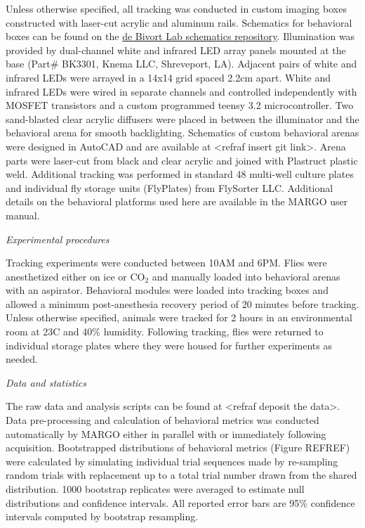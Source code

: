 \documentclass[10pt]{article}
\begin{document}
\begin{multicols}{2}
Unless otherwise specified, all tracking was conducted in custom imaging boxes constructed with laser-cut acrylic and aluminum rails. Schematics for behavioral boxes can be found on the \href{https://github.com/de-Bivort-Lab/dblab-schematics}{de Bivort Lab schematics repository}. Illumination was provided by dual-channel white and infrared LED array panels mounted at the base (Part# BK3301, Knema LLC, Shreveport, LA). Adjacent pairs of white and infrared LEDs were arrayed in a 14x14 grid spaced 2.2cm apart. White and infrared LEDs were wired in separate channels and controlled independently with MOSFET transistors and a custom programmed teensy 3.2 microcontroller. Two sand-blasted clear acrylic diffusers were placed in between the illuminator and the behavioral arena for smooth backlighting. Schematics of custom behavioral arenas were designed in AutoCAD and are available at <refraf insert git link>. Arena parts were laser-cut from black and clear acrylic and joined with Plastruct plastic weld. Additional tracking was performed in standard 48 multi-well culture plates and individual fly storage units (FlyPlates) from FlySorter LLC. Additional details on the behavioral platforms used here are available in the MARGO user manual.

\vspace*{0.5cm}
\noindent\textit{Experimental procedures}
\vspace*{0.3cm}

Tracking experiments were conducted between 10AM and 6PM. Flies were anesthetized either on ice or CO$_{2}$ and manually loaded into behavioral arenas with an aspirator. Behavioral modules were loaded into tracking boxes and allowed a minimum post-anesthesia recovery period of 20 minutes before tracking. Unless otherwise specified, animals were tracked for 2 hours in an environmental room at 23\degree  C and 40\% humidity. Following tracking, flies were returned to individual storage plates where they were housed for further experiments as needed.

\vspace*{0.5cm}
\noindent\textit{Data and statistics}
\vspace*{0.3cm}

The raw data and analysis scripts can be found at <refraf deposit the data>. Data pre-processing and calculation of behavioral metrics was conducted automatically by MARGO either in parallel with or immediately following acquisition. Bootstrapped distributions of behavioral metrics (Figure REFREF) were calculated by simulating individual trial sequences made by re-sampling random trials with replacement up to a total trial number drawn from the shared distribution. 1000 bootstrap replicates were averaged to estimate null distributions and confidence intervals. All reported error bars are 95\% confidence intervals computed by bootstrap resampling.


\end{multicols}
\end{document}
